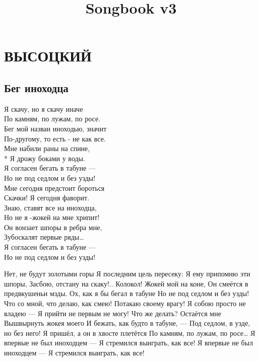 \documentclass{memoir}
\title{Songbook v3}
\begin{document}
\tableofcontents
\clearpage
\chapter*{ВЫСОЦКИЙ}
\clearpage

\section*{Бег иноходца}

\begin{multicols}{2}
\noindent
{\huge
Я скачу, но я скачу иначе\\
По камням, по лужам, по росе.\\
Бег мой назван иноходью, значит\\
По-другому, то есть - не как все.\\

\noindent
Мне набили раны на спине,\\*
Я дрожу боками у воды.\\
Я согласен бегать в табуне —\\
Но не под седлом и без узды!\\

\noindent
Мне сегодня предстоит бороться \\
Скачки! Я сегодня фаворит.\\
Знаю, ставят все на иноходца,\\
Но не я -жокей на мне хрипит!\\

\noindent
Он вонзает шпоры в ребра мне,\\
Зубоскалят первые ряды…\\
Я согласен бегать в табуне —\\
Но не под седлом и без узды!
 }
\columnbreak  
    
Нет, не будут золотыми горы 
Я последним цель пересеку:
Я ему припомню эти шпоры,
Засбою, отстану на скаку!..
Колокол! Жокей мой на коне,
Он смеётся в предвкушеньи мзды.
Ох, как я бы бегал в табуне 
Но не под седлом и без узды!
Что со мной, что делаю, как смею!
Потакаю своему врагу!
Я собою просто не владею —
Я прийти не первым не могу!
Что же делать? Остаётся мне
Вышвырнуть жокея моего
И бежать, как будто в табуне, —
Под седлом, в узде, но без него!
Я пришёл, а он в хвосте плетётся
По камням, по лужам, по росе…
Я впервые не был иноходцем —
Я стремился выиграть, как все!
Я впервые не был иноходцем —
Я стремился выиграть, как все!
\end{multicols}
\end{document}
